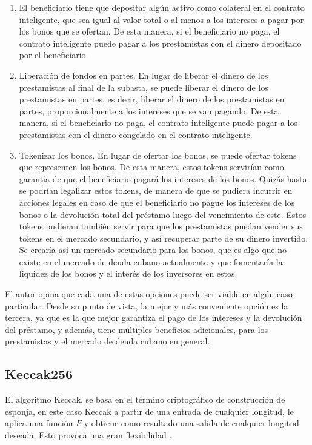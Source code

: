     \begin{enumerate}
      \item El beneficiario tiene que depositar algún activo como colateral en el contrato inteligente, que sea igual al valor total o al menos
      a los intereses a pagar por los bonos que
      se ofertan. De esta manera, si el beneficiario no paga, el contrato inteligente puede pagar a los prestamistas con el dinero
      depositado por el beneficiario.
      \item Liberación de fondos en partes. En lugar de liberar el dinero de los prestamistas al final de la subasta, se puede liberar el 
      dinero de los prestamistas en partes, es decir, liberar el dinero de los prestamistas en partes, proporcionalmente a los intereses 
      que se
      van pagando. De esta manera, si el beneficiario no paga, el contrato inteligente puede pagar a los prestamistas con el dinero
      congelado en el contrato inteligente.
      \item Tokenizar los bonos. En lugar de ofertar los bonos, se puede ofertar tokens que representen los bonos. De esta manera, estos tokens servirían como garantía de que el beneficiario pagará los intereses de los bonos. Quizás hasta se podrían legalizar estos tokens, de manera de que se pudiera incurrir en acciones legales en caso de que el beneficiario no pague los intereses de los bonos o la devolución total  del préstamo luego del vencimiento de este. Estos tokens pudieran también servir para que los prestamistas puedan vender sus tokens en el mercado secundario, y así recuperar parte de su dinero invertido. Se crearía así un mercado secundario para los bonos, que es algo que no existe en el mercado de deuda cubano actualmente y que fomentaría la liquidez de los bonos y el interés de los inversores en estos.
    \end{enumerate}

    El autor opina que cada una de estas opciones puede ser viable en algún caso particular. Desde su punto de vista, la mejor y más conveniente opción es la tercera, ya que es la que mejor garantiza el pago de los intereses y la devolución del préstamo, y además, tiene múltiples beneficios adicionales, para los prestamistas y el mercado de deuda cubano en general.

  \subsection{Keccak256}
    El algoritmo Keccak, se basa en el término criptográfico de construcción de esponja, en este caso 
    Keccak a partir de una entrada de cualquier longitud, le aplica una función $F$ y obtiene como resultado 
    una salida de cualquier longitud deseada. Esto provoca una gran flexibilidad \parencite{bertoni2007}.

